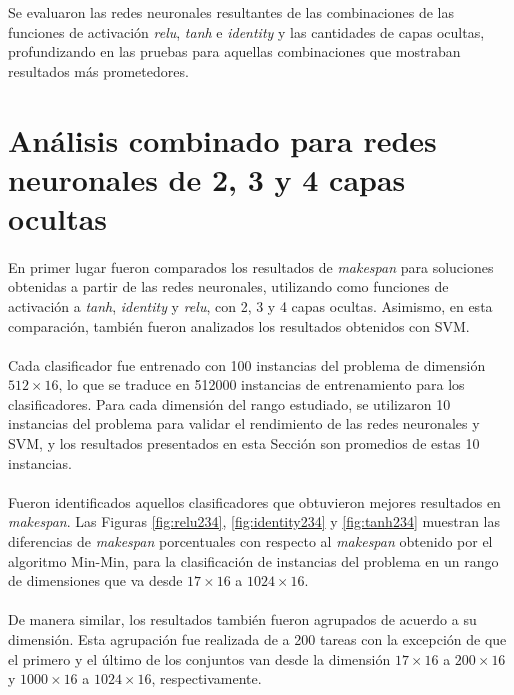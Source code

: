 Se evaluaron las redes neuronales resultantes de las combinaciones de las funciones de activación \textit{relu}, \textit{tanh} e \textit{identity} y las cantidades de capas ocultas, profundizando en las pruebas para aquellas combinaciones que mostraban resultados más prometedores.

\section{Análisis combinado para redes neuronales de 2, 3 y 4 capas ocultas}

\paragraph{}En primer lugar fueron comparados los resultados de \textit{makespan} para soluciones obtenidas a partir de las redes neuronales, utilizando como funciones de activación a \textit{tanh}, \textit{identity} y \textit{relu}, con 2, 3 y 4 capas ocultas.
Asimismo, en esta comparación, también fueron analizados los resultados obtenidos con SVM. 

\paragraph{} Cada clasificador fue entrenado con 100 instancias del problema de dimensión $512\times16$, lo que se traduce en 512000 instancias de entrenamiento para los clasificadores. Para cada dimensión del rango estudiado, se utilizaron 10 instancias del problema para validar el rendimiento de las redes neuronales y SVM, y los resultados presentados en esta Sección son promedios de estas 10 instancias.

\paragraph{} Fueron identificados aquellos clasificadores que obtuvieron mejores resultados en \textit{makespan}.
Las Figuras \ref{fig:relu234}, \ref{fig:identity234} y \ref{fig:tanh234} muestran las diferencias de \textit{makespan} porcentuales con respecto al \textit{makespan} obtenido por el algoritmo Min-Min, para la clasificación de instancias del problema en un rango de dimensiones que va desde $17\times16$ a $1024\times16$.

\paragraph{} De manera similar, los resultados también fueron agrupados de acuerdo a su dimensión.
Esta agrupación fue realizada de a 200 tareas con la excepción de que el primero y el último de los conjuntos van desde la dimensión $17\times16$ a $200\times16$ y $1000\times16$ a $1024\times16$, respectivamente.

